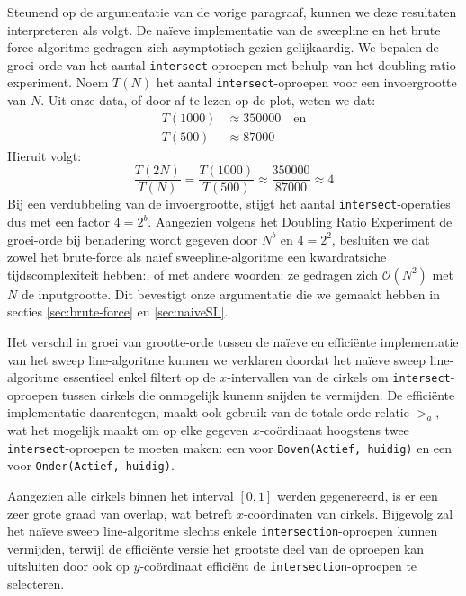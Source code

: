 \documentclass[12pt]{article}
\begin{document}
Steunend op de argumentatie van de vorige paragraaf, kunnen we deze resultaten interpreteren als volgt. De naïeve implementatie van de sweepline en het brute force-algoritme gedragen zich asymptotisch gezien gelijkaardig. We bepalen de groei-orde van het aantal \texttt{intersect}-oproepen met behulp van het doubling ratio experiment. Noem $T(N)$ het aantal \texttt{intersect}-oproepen voor een invoergrootte van $N$. Uit onze data, of door af te lezen op de plot, weten we dat:
\begin{align*}
T(1000) &\approx 350000 \quad\text{en}\\
T(500) &\approx 87000
\end{align*}
Hieruit volgt:
\begin{equation*}
\frac{T(2N)}{T(N)} = \frac{T(1000)}{T(500)} \approx \frac{350000}{87000} \approx 4
\end{equation*}
Bij een verdubbeling van de invoergrootte, stijgt het aantal \texttt{intersect}-operaties dus met een factor $4  =2^b$. Aangezien volgens het Doubling Ratio Experiment de groei-orde bij benadering wordt gegeven door $N^b$ en $4 = 2^2$, besluiten we dat zowel het brute-force als naïef sweepline-algoritme een kwardratsiche tijdscomplexiteit hebben:, of met andere woorden: ze gedragen zich $\mathcal{O}(N^2)$ met $N$ de inputgrootte. Dit bevestigt onze argumentatie die we gemaakt hebben in secties \ref{sec:brute-force} en \ref{sec:naiveSL}.

Het verschil in groei van grootte-orde tussen de naïeve en efficiënte implementatie van het sweep line-algoritme kunnen we verklaren doordat het naïeve sweep line-algoritme essentieel enkel filtert op de $x$-intervallen van de cirkels om \texttt{intersect}-oproepen tussen cirkels die onmogelijk kunenn snijden te vermijden. De efficiënte implementatie daarentegen, maakt ook gebruik van de totale orde relatie $>_a$, wat het mogelijk maakt om op elke gegeven $x$-coördinaat hoogstens twee \texttt{intersect}-oproepen te moeten maken: een voor \texttt{Boven(Actief, huidig)} en een voor \texttt{Onder(Actief, huidig)}.

Aangezien alle cirkels binnen het interval $[0,1]$ werden gegenereerd, is er een zeer grote graad van overlap, wat betreft $x$-coördinaten van cirkels. Bijgevolg zal het naïeve sweep line-algoritme slechts enkele \texttt{intersection}-oproepen kunnen vermijden, terwijl de efficiënte versie het grootste deel van de oproepen kan uitsluiten door ook op $y$-coördinaat efficiënt de \texttt{intersection}-oproepen te selecteren.
\end{document}
